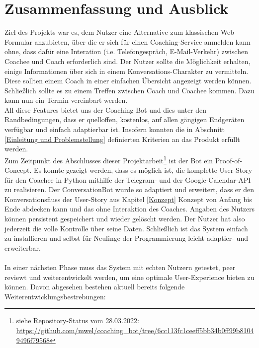 \label{Zusammenfassung und Ausblick}
\chapter{Zusammenfassung und Ausblick}

    Ziel des Projekts war es, dem Nutzer eine Alternative zum klassischen Web-Formular anzubieten, über die er sich für einen Coaching-Service anmelden kann ohne, dass dafür eine Interation (i.e. Telefongespräch, E-Mail-Verkehr) zwischen Coachee und Coach erforderlich sind. Der Nutzer sollte die Möglichkeit erhalten, einige Informationen über sich in einem Konversations-Charakter zu vermitteln. Diese sollten einem Coach in einer einfachen Übersicht angezeigt werden können. Schließlich sollte es zu einem Treffen zwischen Coach und Coachee kommen. Dazu kann nun ein Termin vereinbart werden. \\
    All diese Features bietet uns der Coaching Bot und dies unter den Randbedingungen, dass er quelloffen, kostenlos, auf allen gängigen Endgeräten verfügbar und einfach adaptierbar ist. Insofern konnten die in Abschnitt \ref*{Einleitung und Problemstellung} definierten Kriterien an das Produkt erfüllt werden. \\
    
    Zum Zeitpunkt des Abschlusses dieser Projektarbeit\footnote{siehe Repository-Status vom 28.03.2022: \url{https://github.com/mwel/coaching_bot/tree/6cc113fc1ceeff5bb34b0ff99b81049496f79568}} ist der Bot ein Proof-of-Concept. Es konnte gezeigt werden, dass es möglich ist, die komplette User-Story für den Coachee in Python mithilfe der Telegram- und der Google-Calendar-API zu realisieren. Der ConversationBot wurde so adaptiert und erweitert, dass er den Konversationsfluss der User-Story aus Kapitel \ref*{Konzept} Konzept von Anfang bis Ende abdecken kann und das ohne Interaktion des Coaches. Angaben des Nutzers können persistent gespeichert und wieder gelöscht werden. Der Nutzer hat also jederzeit die volle Kontrolle über seine Daten. Schließlich ist das System einfach zu installieren und selbst für Neulinge der Programmierung leicht adaptier- und erweiterbar.\\
    \\
    In einer nächsten Phase muss das System mit echten Nutzern getestet, peer reviewt und weiterentwickelt werden, um eine optimale User-Experience bieten zu können. Davon abgesehen bestehen aktuell bereits folgende Weiterentwicklungsbestrebungen: 

